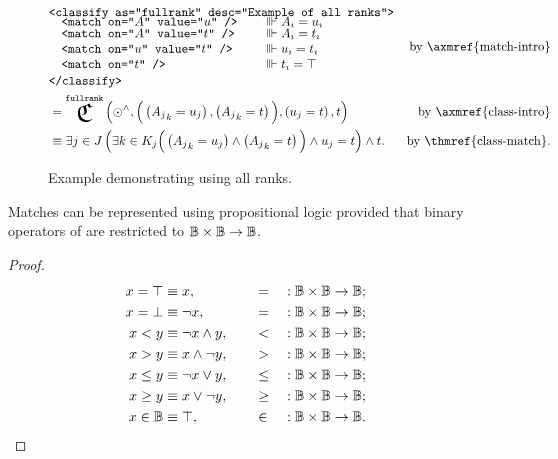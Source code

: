 \begin{figure}[ht]
\begin{align}
  &\begin{aligned}
    &\xml{<classify as="fullrank" desc="Example of all ranks">} \xmlnl
    &\quad\begin{aligned}
      &\xml{<match on="$A$" value="$u$" />}
        \quad&&\equivish \varsub A = \varsub u \\[-2mm]
      &\xml{<match on="$A$" value="$t$" />}
        \quad&&\equivish \varsub A = \varsub t \xmlnll
      &\xml{<match on="$u$" value="$t$" />}
        \quad&&\equivish \varsub u = \varsub t \xmlnll
      &\xml{<match on="$t$" />}
        \quad&&\equivish \varsub t = \true
    \end{aligned} \xmlnll
    &\xml{</classify>}
  \end{aligned}
    &\text{by \axmref{match-intro}} \\
  &= \Classify^\texttt{fullrank}\left(
       \odot^\land,
       \Big(\left({A_j}_k = u_j\right),
             \left({A_j}_k = t \right)
       \Big),
       \left(u_j = t\right),
       t
     \right)
    &\text{by \axmref{class-intro}} \\
  &\equiv \Exists{j\in J}{
            \Exists*{k\in K_j}{\Big(
              \left({A_j}_k = u_j\right)
              \land \left({A_j}_k = t \right)
            \Big)}
            \land u_j = t
          }
          \land t.
    &\text{by \thmref{class-match}}.
\end{align}
\caption{Example demonstrating  using all ranks.}
\label{f:ex:class-match-all-ranks}
\end{figure}

\begin{lemma}
  Matches can be represented using propositional logic provided that
    binary operators of  are restricted to $\mathbb{B}\times\mathbb{B}\rightarrow\mathbb{B}$.
\end{lemma}
\begin{proof}
  \begin{alignat*}{4}
    x = \top  &\equiv x,               &&\quad=    &&: \mathbb{B}\times\mathbb{B}\rightarrow\mathbb{B}; \\
    x = \bot &\equiv \neg x,          &&\quad=    &&: \mathbb{B}\times\mathbb{B}\rightarrow\mathbb{B}; \\
    x < y      &\equiv \neg x \land y,  &&\quad<    &&: \mathbb{B}\times\mathbb{B}\rightarrow\mathbb{B}; \\
    x > y      &\equiv x \land \neg y,  &&\quad>    &&: \mathbb{B}\times\mathbb{B}\rightarrow\mathbb{B}; \\
    x \leq y   &\equiv \neg x \lor y,   &&\quad\leq &&: \mathbb{B}\times\mathbb{B}\rightarrow\mathbb{B}; \\
    x \geq y   &\equiv x \lor \neg y,   &&\quad\geq &&: \mathbb{B}\times\mathbb{B}\rightarrow\mathbb{B}; \\
    x \in\mathbb{B} &\equiv \top,           &&\quad\in  &&: \mathbb{B}\times\mathbb{B}\rightarrow\mathbb{B}.\tag*{\qedhere}
  \end{alignat*}
\end{proof}

